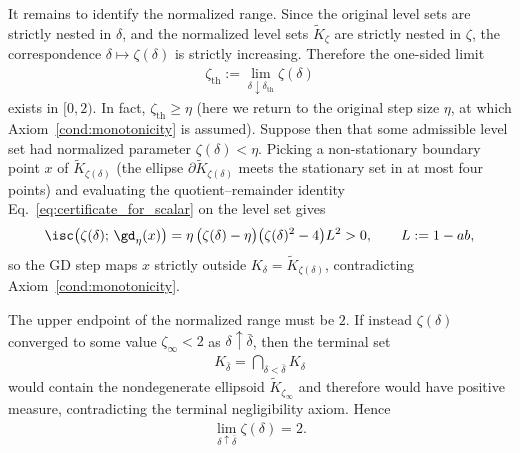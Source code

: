 \documentclass{article}
\begin{document}
It remains to identify the normalized range. Since the original level sets
are strictly nested in $\delta$, and the normalized level sets
$\widetilde K_\zeta$ are strictly nested in $\zeta$, the correspondence
$\delta\mapsto\zeta(\delta)$ is strictly increasing. Therefore the
one-sided limit
\begin{align}
    \zeta_{\mathrm{th}}
    :=
    \lim_{\delta\downarrow\delta_{\mathrm{th}}} \zeta(\delta)
\end{align}
exists in $[0,2)$. In fact, $\zeta_{\mathrm{th}}\ge\eta$ (here we return to the
original step size $\eta$, at which Axiom~\ref{cond:monotonicity} is assumed). Suppose then that some
admissible level set had normalized parameter $\zeta(\delta)<\eta$. Picking a non-stationary boundary point $x$ of
$\widetilde K_{\zeta(\delta)}$ (the ellipse
$\partial\widetilde K_{\zeta(\delta)}$ meets the stationary set in at most
four points) and evaluating the quotient--remainder identity
Eq.~\eqref{eq:certificate_for_scalar} on the level set gives
\begin{align}
\isc\bigl(\zeta(\delta);\,\gd_\eta(x)\bigr)
=\eta\,\bigl(\zeta(\delta)-\eta\bigr)\bigl(\zeta(\delta)^2-4\bigr)L^2>0,
\qquad L:=1-ab,
\end{align}
so the GD step maps $x$ strictly outside
$K_\delta=\widetilde K_{\zeta(\delta)}$, contradicting
Axiom~\ref{cond:monotonicity}.

The upper endpoint of the normalized range must be $2$. If instead
$\zeta(\delta)$ converged to some value $\zeta_\infty<2$ as
$\delta\uparrow\bar\delta$, then the terminal set
\begin{align}
K_{\bar\delta}
=
\bigcap_{\delta<\bar\delta}K_\delta
\end{align}
would contain the nondegenerate ellipsoid $\widetilde K_{\zeta_\infty}$ and
therefore would have positive measure, contradicting the terminal
negligibility axiom. Hence
\begin{align}
\lim_{\delta\uparrow\bar\delta}\zeta(\delta)=2.
\end{align}
\end{document}
